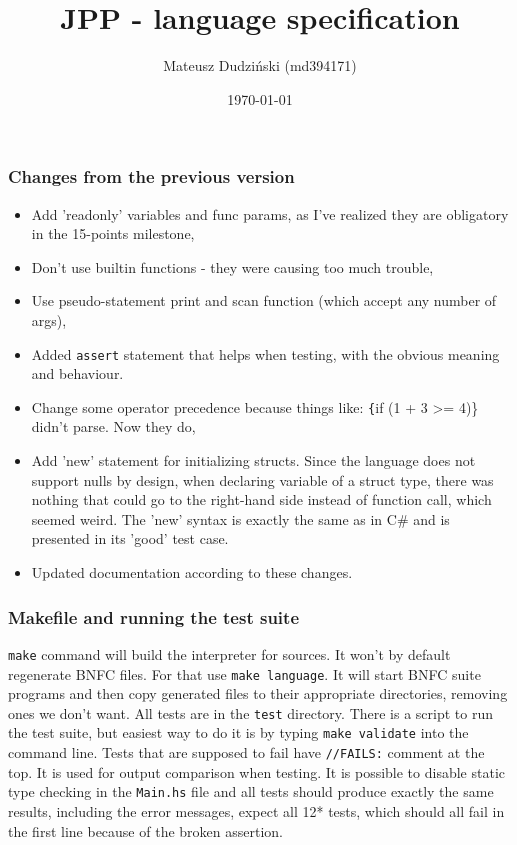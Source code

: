 \documentclass[11pt]{article}
\author{Mateusz Dudziński (md394171)}
\date{\today}
\title{JPP - language specification}
\begin{document}
\maketitle

\subsubsection*{Changes from the previous version}
\label{sec:org68f8247}
\begin{itemize}
\item Add 'readonly' variables and func params, as I've realized they are
obligatory in the 15-points milestone,
\item Don't use builtin functions - they were causing too much trouble,
\item Use pseudo-statement print and scan function (which accept any number of
args),
\item Added \texttt{assert} statement that helps when testing, with the obvious
meaning and behaviour.
\item Change some operator precedence because things like: \texttt\{if (1 + 3 >=
4)\} didn't parse. Now they do,
\item Add 'new' statement for initializing structs. Since the language does not
support nulls by design, when declaring variable of a struct type, there was
nothing that could go to the right-hand side instead of function call, which
seemed weird. The 'new' syntax is exactly the same as in C\# and is presented
in its 'good' test case.
\item Updated documentation according to these changes.
\end{itemize}

\subsubsection*{Makefile and running the test suite}
\label{sec:org8de3ee1}
\texttt{make} command will build the interpreter for sources. It won't by
default regenerate BNFC files. For that use \texttt{make language}. It will
start BNFC suite programs and then copy generated files to their appropriate
directories, removing ones we don't want. All tests are in the \texttt{test}
directory. There is a script to run the test suite, but easiest way to do it
is by typing \texttt{make validate} into the command line. Tests that are
supposed to fail have \texttt{//FAILS:} comment at the top. It is used for
output comparison when testing. It is possible to disable static type
checking in the \texttt{Main.hs} file and all tests should produce exactly
the same results, including the error messages, expect all 12* tests, which
should all fail in the first line because of the broken assertion.
\end{document}
